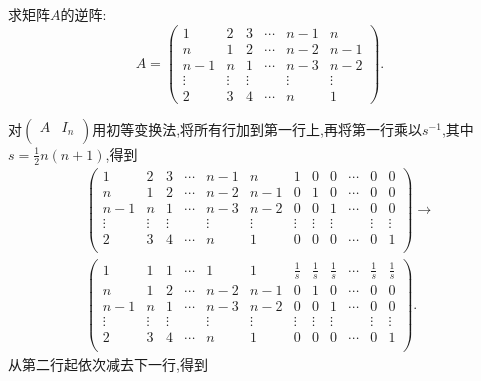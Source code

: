 \documentclass[../../main.tex]{subfiles}
\begin{document}
\begin{exercise}
求矩阵\(A\)的逆阵:
\[
A = 
\begin{pmatrix}
1 & 2 & 3 & \cdots & n - 1 & n \\
n & 1 & 2 & \cdots & n - 2 & n - 1 \\
n - 1 & n & 1 & \cdots & n - 3 & n - 2 \\
\vdots & \vdots & \vdots & & \vdots & \vdots \\
2 & 3 & 4 & \cdots & n & 1
\end{pmatrix}.
\]
\end{exercise}
\begin{solution}
对\(\left( \begin{matrix}
A&		I_n\\
\end{matrix} \right) \)用初等变换法,将所有行加到第一行上,再将第一行乘以\(s^{-1}\),其中\(s = \frac{1}{2}n(n + 1)\),得到
\setcounter{MaxMatrixCols}{20} %
\begin{gather*}
\left( \begin{matrix}
1&		2&		3&		\cdots&		n-1&		n&		1&		0&		0&		\cdots&		0&		0\\
n&		1&		2&		\cdots&		n-2&		n-1&		0&		1&		0&		\cdots&		0&		0\\
n-1&		n&		1&		\cdots&		n-3&		n-2&		0&		0&		1&		\cdots&		0&		0\\
\vdots&		\vdots&		\vdots&		&		\vdots&		\vdots&		\vdots&		\vdots&		\vdots&		&		\vdots&		\vdots\\
2&		3&		4&		\cdots&		n&		1&		0&		0&		0&		\cdots&		0&		1\\
\end{matrix} \right) \rightarrow
\\
\left( \begin{matrix}
1&		1&		1&		\cdots&		1&		1&		\frac{1}{s}&		\frac{1}{s}&		\frac{1}{s}&		\cdots&		\frac{1}{s}&		\frac{1}{s}\\
n&		1&		2&		\cdots&		n-2&		n-1&		0&		1&		0&		\cdots&		0&		0\\
n-1&		n&		1&		\cdots&		n-3&		n-2&		0&		0&		1&		\cdots&		0&		0\\
\vdots&		\vdots&		\vdots&		&		\vdots&		\vdots&		\vdots&		\vdots&		\vdots&		&		\vdots&		\vdots\\
2&		3&		4&		\cdots&		n&		1&		0&		0&		0&		\cdots&		0&		1\\
\end{matrix} \right) .
\end{gather*}
从第二行起依次减去下一行,得到
\begin{gather*}

\end{gather*}
\end{solution}
\end{document}
